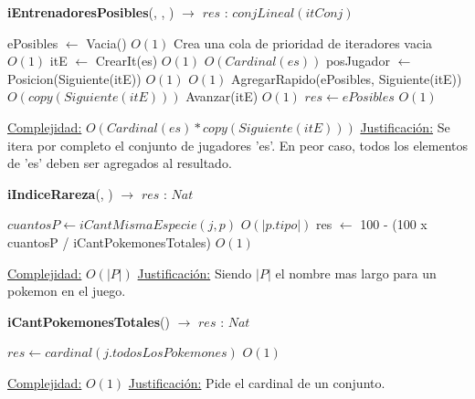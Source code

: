 \begin{algorithm}[H]{\textbf{iEntrenadoresPosibles}(, , )  $\to$ $res$ : $conjLineal(itConj)$} 
	{}
	\begin{algorithmic}
		\State ePosibles $\gets$ Vacia()  \Comment $O(1)$ {Crea una cola de prioridad de iteradores vacia}
			\Comment $O(1)$
			\State itE $\gets$ CrearIt(es)	\Comment $O(1)$
			 \Comment $O(Cardinal(es))$
				\State posJugador $\gets$ Posicion(Siguiente(itE))	\Comment $O(1)$
				 \Comment $O(1)$
					\State AgregarRapido(ePosibles, Siguiente(itE))	\Comment $O(copy(Siguiente(itE)))$
				\EndIf
				\State Avanzar(itE)	\Comment $O(1)$
			\EndWhile
		\EndIf
		\State $res \gets ePosibles$ \Comment $O(1)$
	
		\medskip
		\Statex \underline{Complejidad:} $O(Cardinal(es) * copy(Siguiente(itE)))$
		\Statex \underline{Justificación:} Se itera por completo el conjunto de jugadores 'es'. En peor caso, todos los elementos de 'es' deben ser agregados al resultado.
    \end{algorithmic}
\end{algorithm}

\begin{algorithm}[H]{\textbf{iIndiceRareza}(, )  $\to$ $res$ : $Nat$} 
	{}
	\begin{algorithmic}
		\State $cuantosP \gets iCantMismaEspecie(j, p) $ \Comment $O(|p.tipo|)$
		\State res $\gets$ 100 - (100 x cuantosP / iCantPokemonesTotales)  \Comment $O(1)$
	
		\medskip
		\Statex \underline{Complejidad:} $O(|P|)$
		\Statex \underline{Justificación:} Siendo $|P|$ el nombre mas largo para un pokemon en el juego.
    \end{algorithmic}
\end{algorithm}

\begin{algorithm}[H]{\textbf{iCantPokemonesTotales}() $\to$ $res$ : $Nat$} 
	{}
	\begin{algorithmic}
		\State $res \gets cardinal(j.todosLosPokemones) $ \Comment $O(1)$
	
		\medskip
		\Statex \underline{Complejidad:} $O(1)$
		\Statex \underline{Justificación:} Pide el cardinal de un conjunto.
    \end{algorithmic}
\end{algorithm}


